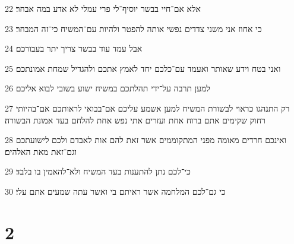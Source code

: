 \par 22 אלא אם־חיי בבשר יוסיף־לי פרי עמלי לא אדע במה אבחר׃
\par 23 כי אחוז אני משני צדדים נפשי אותה להפטר ולהיות עם־המשיח כי־זה המבחר׃
\par 24 אבל עמד עוד בבשר צריך יתר בעבורכם׃
\par 25 ואני בטח וידע שאותר ואעמד עם־כלכם יחד לאמץ אתכם ולהגדיל שמחת אמונתכם׃
\par 26 למען תרבה על־ידי תהלתכם במשיח ישוע בשובי לבוא אליכם׃
\par 27 רק התנהגו כראוי לבשורת המשיח למען אשמע עליכם אם־בבואי לראותכם אם־בהיותי רחוק שקימים אתם ברוח אחת ועזרים אתי נפש אחת להלחם בעד אמונת הבשורה׃
\par 28 ואינכם חרדים מאומה מפני המתקוממים אשר זאת להם אות לאבדם ולכם לישועתכם וגם־זאת מאת האלהים׃
\par 29 כי־לכם נתן להתענות בעד המשיח ולא־להאמין בו בלבד׃
\par 30 כי גם־לכם המלחמה אשר ראיתם בי ואשר עתה שמעים אתם עלי׃

\chapter{2}

